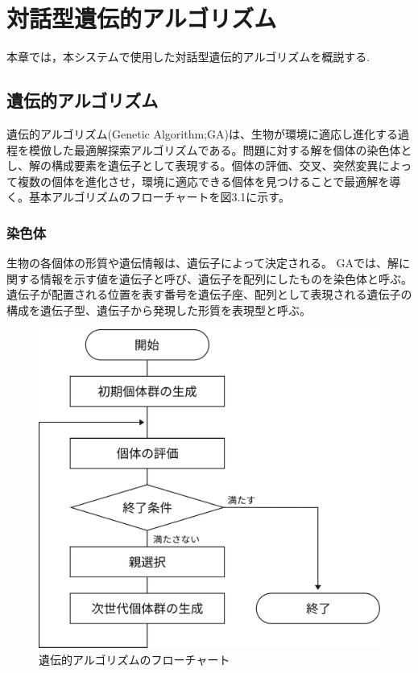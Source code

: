 \chapter{対話型遺伝的アルゴリズム}
本章では，本システムで使用した対話型遺伝的アルゴリズムを概説する.
\section{遺伝的アルゴリズム}
遺伝的アルゴリズム(Genetic Algorithm;GA)は、生物が環境に適応し進化する過程を模倣した最適解探索アルゴリズムである。問題に対する解を個体の染色体とし、解の構成要素を遺伝子として表現する。個体の評価、交叉、突然変異によって複数の個体を進化させ，環境に適応できる個体を見つけることで最適解を導く。基本アルゴリズムのフローチャートを図3.1に示す。

\subsection{染色体}
生物の各個体の形質や遺伝情報は、遺伝子によって決定される。
GAでは、解に関する情報を示す値を遺伝子と呼び、遺伝子を配列にしたものを染色体と呼ぶ。
遺伝子が配置される位置を表す番号を遺伝子座、配列として表現される遺伝子の構成を遺伝子型、遺伝子から発現した形質を表現型と呼ぶ。

\begin{figure}[htbp]
	\begin{center}
		\includegraphics[scale=0.3]{image/flowchart.pdf}
		\caption{遺伝的アルゴリズムのフローチャート}
		\label{c-end}
	\end{center}
\end{figure}

